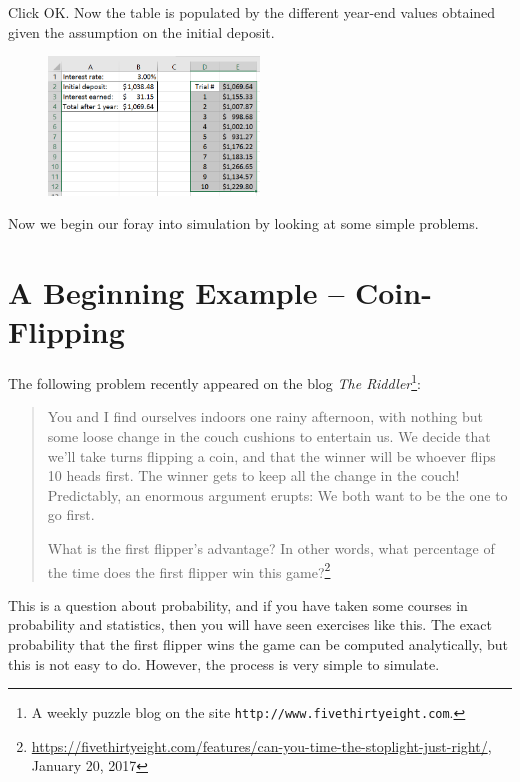 \begin{myexample}
Click OK.
Now the table is populated by the different year-end values obtained given the assumption on the initial deposit.

\begin{figure}[htbp]
	\centering
	\includegraphics[width=0.5\textwidth]{fig/3_datatable3_3.png}
	\label{fig:3_datatable3_3}
\end{figure}
 

\end{myexample}

Now we begin our foray into simulation by looking at some simple problems.


\section{A Beginning Example -- Coin-Flipping}\label{sec3:begin}

The following problem recently appeared on the blog \emph{The Riddler}\footnote{A weekly puzzle blog on the site \texttt{http://www.fivethirtyeight.com}.}:

\begin{quote}
You and I find ourselves indoors one rainy afternoon, with nothing but some loose change in the couch cushions to entertain us. We decide that we'll take turns flipping a coin, and that the winner will be whoever flips 10 heads first. The winner gets to keep all the change in the couch! Predictably, an enormous argument erupts: We both want to be the one to go first.

What is the first flipper's advantage? In other words, what percentage of the time does the first flipper win this game?\footnote{\url{https://fivethirtyeight.com/features/can-you-time-the-stoplight-just-right/}, \\ January 20, 2017}
\end{quote}

This is a question about probability, and if you have taken some courses in probability and statistics, then you will  have seen exercises like this.
The exact probability that the first flipper wins the game can be computed analytically, but this is not easy to do.
However, the process is very simple to simulate.

